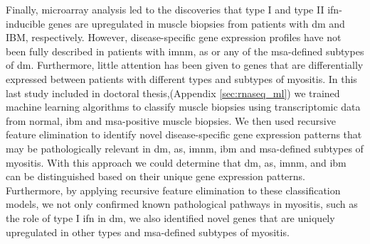 Finally, microarray analysis led to the discoveries that type I and type II \gls{ifn}-inducible genes are upregulated in muscle biopsies from patients with \gls{dm}\cite{Greenberg2005} and IBM,\cite{Ivanidze2011,Allenbach2014} respectively. However, disease-specific gene expression profiles have not been fully described in patients with \gls{imnm}, \gls{as} or any of the \gls{msa}-defined subtypes of \gls{dm}. Furthermore, little attention has been given to genes that are differentially expressed between patients with different types and subtypes of myositis.\cite{Greenberg2005,Greenberg2002,Hamann2017,Raju2005} In this last study included in doctoral thesis,(Appendix \autoref{sec:rnaseq_ml}) we trained machine learning algorithms to classify muscle biopsies using transcriptomic data from normal, \gls{ibm} and \gls{msa}-positive muscle biopsies. We then used recursive feature elimination to identify novel disease-specific gene expression patterns that may be pathologically relevant in \gls{dm},  \gls{as}, \gls{imnm}, \gls{ibm} and \gls{msa}-defined subtypes of myositis. With this approach we could determine that \gls{dm},  \gls{as}, \gls{imnm}, and \gls{ibm} can be distinguished based on their unique gene expression patterns. Furthermore, by applying recursive feature elimination to these classification models, we not only confirmed known pathological pathways in myositis, such as the role of type I \gls{ifn} in \gls{dm}, we also identified novel genes that are uniquely upregulated in other types and \gls{msa}-defined subtypes of myositis. 

